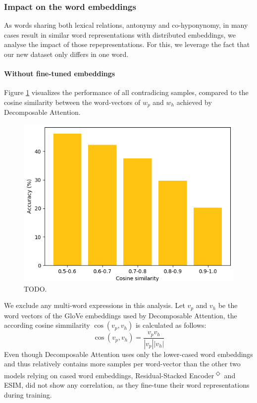 \subsubsection{Impact on the word embeddings}
As words sharing both lexical relations, antonymy and co-hyponynomy, in many cases result in similar word representations with distributed embeddings, we analyse the impact of those repepresentations. For this, we leverage the fact that our new dataset only differs in one word.
\paragraph*{Without fine-tuned embeddings}
Figure \ref{fig:decomp_acc_per_cos_sim} visualizes the performance of all contradicing samples, compared to the cosine similarity between the word-vectors of $w_p$ and $w_h$ achieved by Decomposable Attention. 
\begin{figure}[tph!]
\centering
	\includegraphics[totalheight=5cm]{fig/acc_by_cos.png}
	\caption{TODO.}
	\label{fig:decomp_acc_per_cos_sim}
\end{figure}
We exclude any multi-word expressions in this analysis. Let $v_p$ and $v_h$ be the word vectors of the GloVe embeddings used by Decomposable Attention, the according cosine simmilarity $\cos(v_p,v_h)$ is calculated as follows:
\begin{equation}
\cos(v_p,v_h) = \frac{v_p v_h}{|v_p| |v_h|}
\end{equation}
Even though Decomposable Attention uses only the lower-cased word embeddings and thus relatively contains more samples per word-vector than the other two models relying on cased word embeddings, Residual-Stacked Encoder\textsuperscript{$\Diamond$} and ESIM,  did not show any correlation, as they fine-tune their word representations during training.
